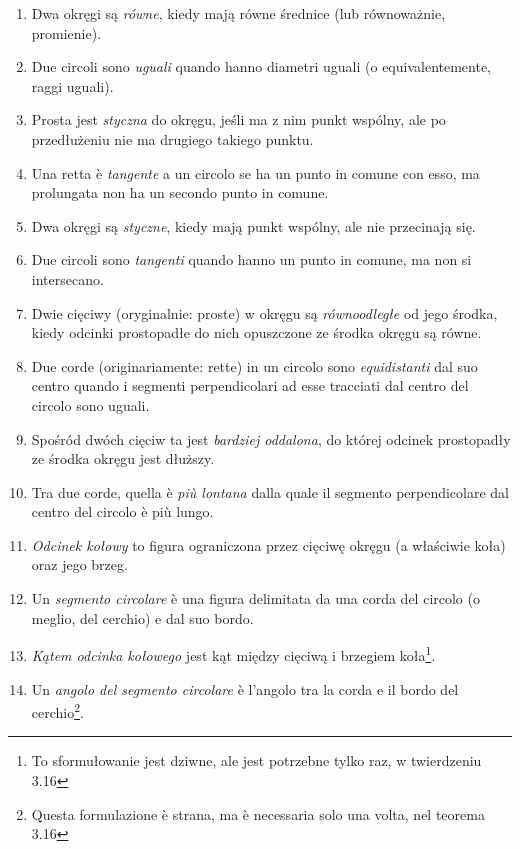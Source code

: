 \begin{enumerate}
    \item [3.1] Dwa okręgi są \emph{równe}, kiedy mają równe średnice (lub równoważnie, promienie). %
    \item [3.1] Due circoli sono \emph{uguali} quando hanno diametri uguali (o equivalentemente, raggi uguali). %

    \item [3.2] Prosta jest \emph{styczna} do okręgu, jeśli ma z nim punkt wspólny, ale po przedłużeniu nie ma drugiego takiego punktu. %
    \item [3.2] Una retta è \emph{tangente} a un circolo se ha un punto in comune con esso, ma prolungata non ha un secondo punto in comune. %

    \item [3.3] Dwa okręgi są \emph{styczne}, kiedy mają punkt wspólny, ale nie przecinają się. %
    \item [3.3] Due circoli sono \emph{tangenti} quando hanno un punto in comune, ma non si intersecano. %

    \item [3.4] Dwie cięciwy (oryginalnie: proste) w okręgu są \emph{równoodległe} od jego środka, kiedy odcinki prostopadłe do nich opuszczone ze środka okręgu są równe. %
    \item [3.4] Due corde (originariamente: rette) in un circolo sono \emph{equidistanti} dal suo centro quando i segmenti perpendicolari ad esse tracciati dal centro del circolo sono uguali. %

    \item [3.5] Spośród dwóch cięciw ta jest \emph{bardziej oddalona}, do której odcinek prostopadły ze środka okręgu jest dłuższy. %
    \item [3.5] Tra due corde, quella è \emph{più lontana} dalla quale il segmento perpendicolare dal centro del circolo è più lungo. %

    \item [3.6] \emph{Odcinek kołowy} to figura ograniczona przez cięciwę okręgu (a właściwie koła) oraz jego brzeg. %
    \item [3.6] Un \emph{segmento circolare} è una figura delimitata da una corda del circolo (o meglio, del cerchio) e dal suo bordo. %

    \item [3.7] \emph{Kątem odcinka kołowego} jest kąt między cięciwą i brzegiem koła\footnote{To sformułowanie jest dziwne, ale jest potrzebne tylko raz, w twierdzeniu 3.16}. %
    \item [3.7] Un \emph{angolo del segmento circolare} è l'angolo tra la corda e il bordo del cerchio\footnote{Questa formulazione è strana, ma è necessaria solo una volta, nel teorema 3.16}. %


\end{enumerate}
